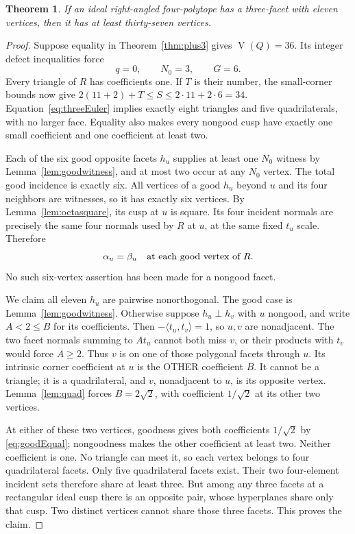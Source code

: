 \documentclass[11pt]{article}
\newtheorem{theorem}{Theorem}[section]
\theoremstyle{remark}
\newcommand{\VV}{\operatorname{V}}
\newcommand{\ip}[2]{\langle #1,#2\rangle}
\begin{document}
\begin{theorem}\label{thm:eleven}
If an ideal right-angled four-polytope has a three-facet with eleven
vertices, then it has at least thirty-seven vertices.
\end{theorem}
\begin{proof}
Suppose equality in Theorem~\ref{thm:plus3} gives $\VV(Q)=36$.
Its integer defect inequalities force
\[
 q=0,\qquad N_0=3,\qquad G=6.
\]
Every triangle of $R$ has coefficients one. If $T$ is their number,
the small-corner bounds now give
$2(11+2)+T\le S\le2\cdot11+2\cdot6=34$.
Equation~\eqref{eq:threeEuler} implies exactly eight triangles and
five quadrilaterals, with no larger face. Equality also makes every
nongood cusp have exactly one small coefficient and one coefficient
at least two.

Each of the six good opposite facets $h_u$ supplies at least one
$N_0$ witness by Lemma~\ref{lem:goodwitness}, and at most two occur
at any $N_0$ vertex. The total good incidence is exactly six.
All vertices of a good $h_u$ beyond $u$ and its four neighbors
are witnesses, so it has exactly six vertices. By
Lemma~\ref{lem:octasquare}, its cusp at $u$ is square. Its four
incident normals are precisely the same four normals used by $R$
at $u$, at the same fixed $t_u$ scale. Therefore
\begin{equation}\label{eq:goodEqual}
 \alpha_u=\beta_u\quad\hbox{at each good vertex of }R.
\end{equation}
No such six-vertex assertion has been made for a nongood facet.

We claim all eleven $h_u$ are pairwise nonorthogonal. The good case
is Lemma~\ref{lem:goodwitness}. Otherwise suppose $h_u\perp h_v$
with $u$ nongood, and write $A<2\le B$ for its coefficients.
Then $-\ip{t_u}{t_v}=1$, so $u,v$ are nonadjacent. The two facet
normals summing to $At_u$ cannot both miss $v$, or their products
with $t_v$ would force $A\ge2$. Thus $v$ is on one of those polygonal
facets through $u$. Its intrinsic corner coefficient at $u$ is the
OTHER coefficient $B$. It cannot be a triangle; it is a quadrilateral,
and $v$, nonadjacent to $u$, is its opposite vertex. Lemma~\ref{lem:quad}
forces $B=2\sqrt2$, with coefficient $1/\sqrt2$ at its other two
vertices.

At either of these two vertices, goodness gives both coefficients
$1/\sqrt2$ by \eqref{eq:goodEqual}; nongoodness makes the other
coefficient at least two. Neither coefficient is one. No triangle
can meet it, so each vertex belongs to four quadrilateral facets.
Only five quadrilateral facets exist. Their two four-element incident
sets therefore share at least three. But among any three facets at
a rectangular ideal cusp there is an opposite pair, whose hyperplanes
share only that cusp. Two distinct vertices cannot share those three
facets. This proves the claim.


\end{proof}
\end{document}
